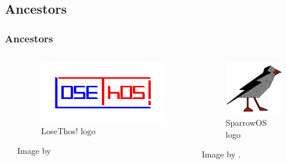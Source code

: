 \documentclass{beamer}
\begin{document}
	\subsection{Ancestors}
	\begin{frame}
		\frametitle{Ancestors}

		\begin{columns}
			\begin{column}{0.33\textwidth}
			\end{column}

			\begin{column}{0.33\textwidth}
				\begin{figure}
					\centering
					\includegraphics[width=1.0\linewidth]{images/losethos.png}
					\caption{LoseThos! logo}
					\label{fig:losethos}
				\end{figure}
				Image by \cite{terry_a_davis_taught_us_how_to_talk_to_god__davisanism_losethos_2023}
			\end{column}

			\begin{column}{0.33\textwidth}
				\begin{figure}
					\centering
					\includegraphics[width=0.5\linewidth]{images/sparrow.png}
					\caption{SparrowOS logo}
					\label{fig:sparrowos}
				\end{figure}
				Image by \cite{absolute_terry_davis_32_2021}.
			\end{column}
		\end{columns}
	\end{frame}
\end{document}
